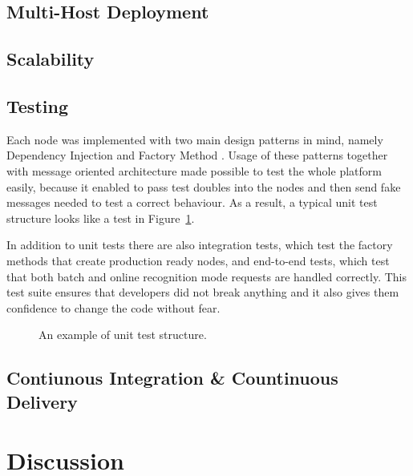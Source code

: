 \subsection{Multi-Host Deployment}
\BLIND
{}

\subsection{Scalability}
\BLIND

\subsection{Testing}
Each node was implemented with two main design patterns in mind, namely Dependency Injection \cite{fowler2004inversion} and Factory Method \cite{gamma1993design}.
Usage of these patterns together with message oriented architecture made possible to test the whole platform easily,
  because it enabled to pass test doubles into the nodes
  and then send fake messages needed to test a correct behaviour.
As a result, a typical unit test structure looks like a test in Figure~\ref{fig:unit-test}.

In addition to unit tests there are also integration tests,
  which test the factory methods that create production ready nodes,
  and end-to-end tests,
  which test that both batch and online recognition mode requests are handled correctly.
This test suite ensures that developers did not break anything
  and it also gives them confidence to change the code without fear.

\begin{figure}[h]
  

  \caption{An example of unit test structure.}
  \label{fig:unit-test}
\end{figure}


\subsection{Contiunous Integration \& Countinuous Delivery}
\BLIND


\section{Discussion}
